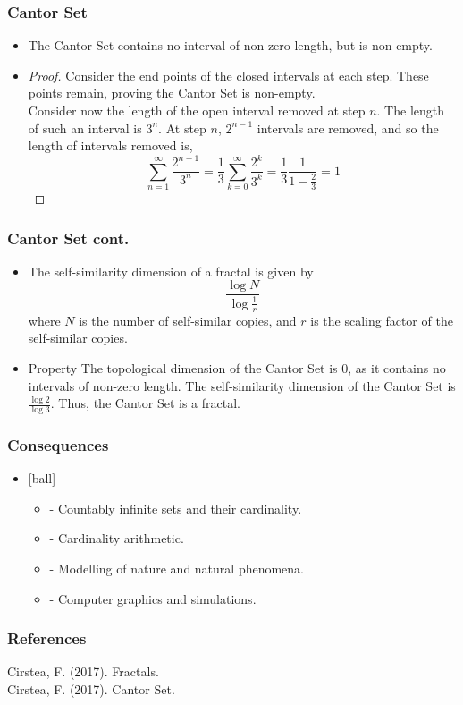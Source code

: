 \documentclass{beamer}
\newcommand{\ds}{\displaystyle}
\begin{document}
\begin{frame}
	\frametitle{Cantor Set}
	\begin{itemize}
		\item<2->
		\begin{theorem}
			The Cantor Set contains no interval of non-zero length, but is non-empty.
		\end{theorem}
		\item<3->
		\begin{proof}
			Consider the end points of the closed intervals at each step. These points remain, proving the Cantor Set is non-empty.\\
			Consider now the length of the open interval removed at step $\ds{n}$. The length of such an interval is $\ds{3^n}$. At step $\ds{n}$, $\ds{2^{n-1}}$ intervals are removed, and so the length of intervals removed is,
			$$\sum^{\infty}_{n=1}\frac{2^{n-1}}{3^n} = \frac{1}{3}\sum^{\infty}_{k=0}\frac{2^{k}}{3^k} = \frac{1}{3}\frac{1}{1-\frac{2}{3}} = 1$$
		\end{proof}
	\end{itemize}
\end{frame}

\begin{frame}
	\frametitle{Cantor Set cont.}
	\begin{itemize}
		\item<2->
		\begin{definition}
			The self-similarity dimension of a fractal is given by 
			$$\frac{\log N}{\log{\frac{1}{r}}}$$
			where $\ds{N}$ is the number of self-similar copies, and $\ds{r}$ is the scaling factor of the self-similar copies.
		\end{definition}
		\item<3->
		\begin{block}{Property}
			The topological dimension of the Cantor Set is 0, as it contains no intervals of non-zero length. The self-similarity dimension of the Cantor Set is $\ds{\frac{\log 2}{\log 3}}$. Thus, the Cantor Set is a fractal.
		\end{block}
	\end{itemize}
\end{frame}

\begin{frame}
	\frametitle{Consequences}
	\begin{itemize}
		\item<2->
		\begin{block}{}
		\begin{itemize}
			\item - Countably infinite sets and their cardinality. 
			\item - Cardinality arithmetic.
			\item - Modelling of nature and natural phenomena.
			\item - Computer graphics and simulations.
		\end{itemize}
		\end{block}
	\end{itemize}
\end{frame}

\begin{frame}
	\frametitle{References}
	Cirstea, F. (2017). Fractals.\\
	Cirstea, F. (2017). Cantor Set.\\
\end{frame}
\end{document}
